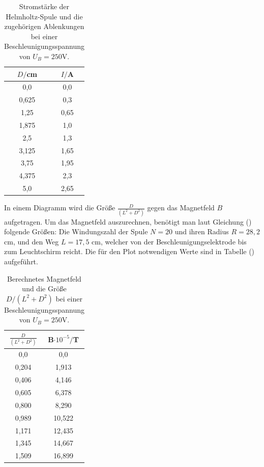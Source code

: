 \begin{table}[H]
  \centering
  \caption{Stromstärke der Helmholtz-Spule und die zugehörigen Ablenkungen bei einer Beschleunigungsspannung von $U_B = 250 \si{\volt}$.}
  \label{tab:Parameter}
  \begin{tabular}{c c}
    \toprule
    $D/$cm& $I/$A \\
    \bottomrule
    0,0 & 0,0 \\
     0,625 & 0,3  \\
     1,25 & 0,65 \\
     1,875 & 1,0  \\
     2,5 & 1,3 \\
     3,125 & 1,65  \\
     3,75& 1,95  \\
     4,375 & 2,3  \\
     5,0 &  2,65 \\
     \bottomrule
  \end{tabular}
\end{table}

In einem Diagramm wird die Größe $\frac{D}{(L^2+D^2)}$ gegen das Magnetfeld $B$ aufgetragen.
Um das Magnetfeld auszurechnen, benötigt man laut Gleichung () folgende Größen: Die Windungszahl der Spule $N=20$ und ihren Radius $R=28,2$\si{\cm}, und
den Weg $L=17,5$ \si{\cm}, welcher von der Beschleunigungselektrode bis zum Leuchtschirm reicht.
Die für den Plot notwendigen Werte sind in Tabelle () aufgeführt.

\begin{table}[H]
  \centering
  \caption{Berechnetes Magnetfeld und die Größe $D/(L^2+D^2)$ bei einer Beschleunigungsspannung von $U_B = 250 \si{\volt}$.}
  \label{tab:Parameter}
  \begin{tabular}{c c}
    \toprule
    $\frac{D}{(L^2+D^2)}$& $ $B$ \cdot 10^{-5} /$T \\
    \bottomrule
     0,0 & 0,0 \\
     0,204 & 1,913  \\
     0,406 & 4,146 \\
     0,605 & 6,378 \\
     0,800 & 8,290 \\
     0,989 & 10,522  \\
     1,171 & 12,435  \\
     1,345 & 14,667 \\
     1,509 & 16,899 \\
     \bottomrule
  \end{tabular}
\end{table}



